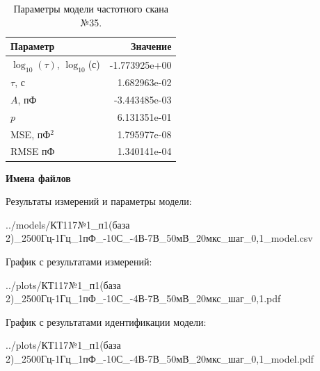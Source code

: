 \begin{table}[!ht]
    \centering
    \caption{Параметры модели частотного скана №35.}
    \begin{tabular}{|l|r|}
        \hline
        Параметр                                       & Значение                  \\ \hline
        $\log_{10}(\tau)$, $\log_{10}$(с)              & -1.773925e+00             \\ \hline
        $\tau$, с                                      & 1.682963e-02              \\ \hline
        $A$, пФ                                        & -3.443485e-03             \\ \hline
        $p$                                            & 6.131351e-01              \\ \hline
        MSE, пФ$^2$                                    & 1.795977e-08              \\ \hline
        RMSE пФ                                        & 1.340141e-04              \\ \hline
    \end{tabular}
    \label{table:frequency_scan_model_35}
\end{table}

\textbf{Имена файлов}

Результаты измерений и параметры модели:

\scriptsize../models/КТ117№1\_п1(база 2)\_2500Гц-1Гц\_1пФ\_-10С\_-4В-7В\_50мВ\_20мкс\_шаг\_0,1\_model.csv
\normalsize

График с результатами измерений:

\scriptsize../plots/КТ117№1\_п1(база 2)\_2500Гц-1Гц\_1пФ\_-10С\_-4В-7В\_50мВ\_20мкс\_шаг\_0,1.pdf
\normalsize

График с результатами идентификации модели:

\scriptsize../plots/КТ117№1\_п1(база 2)\_2500Гц-1Гц\_1пФ\_-10С\_-4В-7В\_50мВ\_20мкс\_шаг\_0,1\_model.pdf
\normalsize

